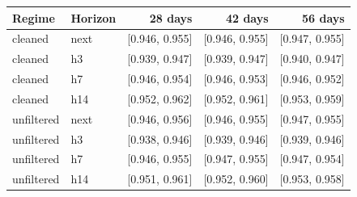 \begin{tabular}{@{}llrrr@{}}\toprule
Regime & Horizon & 28 days & 42 days & 56 days\\\midrule
cleaned & next & [0.946, 0.955] & [0.946, 0.955] & [0.947, 0.955] \\
cleaned & h3 & [0.939, 0.947] & [0.939, 0.947] & [0.940, 0.947] \\
cleaned & h7 & [0.946, 0.954] & [0.946, 0.953] & [0.946, 0.952] \\
cleaned & h14 & [0.952, 0.962] & [0.952, 0.961] & [0.953, 0.959] \\
unfiltered & next & [0.946, 0.956] & [0.946, 0.955] & [0.947, 0.955] \\
unfiltered & h3 & [0.938, 0.946] & [0.939, 0.946] & [0.939, 0.946] \\
unfiltered & h7 & [0.946, 0.955] & [0.947, 0.955] & [0.947, 0.954] \\
unfiltered & h14 & [0.951, 0.961] & [0.952, 0.960] & [0.953, 0.958] \\
\bottomrule\end{tabular}
